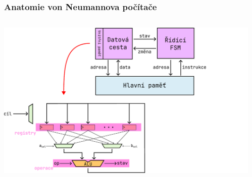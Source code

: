 \documentclass[aspectratio=169,11pt,svgnames,handout]{beamer}
\begin{document}
\begin{frame}
 \frametitle{Anatomie von Neumannova počítače}
 \begin{columns}[T]
  \begin{column}{.6\textwidth}
   \vspace*{-1em}
   \begin{center}
    \includegraphics[width=1.2\textwidth]{anatomy-3.pdf}
   \end{center}
  \end{column}
  \begin{column}{.39\textwidth}
  \end{column}
 \end{columns}
\end{frame}
\end{document}

